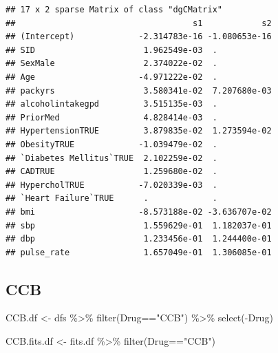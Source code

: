 \documentclass[
]{article}
\newenvironment{Shaded}{\begin{snugshade}}{\end{snugshade}}
\newcommand{\FloatTok}[1]{\textcolor[rgb]{0.00,0.00,0.81}{#1}}
\newcommand{\FunctionTok}[1]{\textcolor[rgb]{0.00,0.00,0.00}{#1}}
\newcommand{\NormalTok}[1]{#1}
\newcommand{\OtherTok}[1]{\textcolor[rgb]{0.56,0.35,0.01}{#1}}
\newcommand{\SpecialCharTok}[1]{\textcolor[rgb]{0.00,0.00,0.00}{#1}}
\newcommand{\StringTok}[1]{\textcolor[rgb]{0.31,0.60,0.02}{#1}}
\begin{document}
\begin{Shaded}
\end{Shaded}

\begin{verbatim}
## 17 x 2 sparse Matrix of class "dgCMatrix"
##                                    s1            s2
## (Intercept)             -2.314783e-16 -1.080653e-16
## SID                      1.962549e-03  .           
## SexMale                  2.374022e-02  .           
## Age                     -4.971222e-02  .           
## packyrs                  3.580341e-02  7.207680e-03
## alcoholintakegpd         3.515135e-03  .           
## PriorMed                 4.828414e-03  .           
## HypertensionTRUE         3.879835e-02  1.273594e-02
## ObesityTRUE             -1.039479e-02  .           
## `Diabetes Mellitus`TRUE  2.102259e-02  .           
## CADTRUE                  1.259680e-02  .           
## HypercholTRUE           -7.020339e-03  .           
## `Heart Failure`TRUE      .             .           
## bmi                     -8.573188e-02 -3.636707e-02
## sbp                      1.559629e-01  1.182037e-01
## dbp                      1.233456e-01  1.244400e-01
## pulse_rate               1.657049e-01  1.306085e-01
\end{verbatim}

\hypertarget{ccb}{%
\subsection{CCB}\label{ccb}}

\begin{Shaded}
\begin{Highlighting}[]
\NormalTok{CCB.df }\OtherTok{\textless{}{-}}\NormalTok{ dfs }\SpecialCharTok{\%\textgreater{}\%} 
  \FunctionTok{filter}\NormalTok{(Drug}\SpecialCharTok{==}\StringTok{"CCB"}\NormalTok{) }\SpecialCharTok{\%\textgreater{}\%} 
  \FunctionTok{select}\NormalTok{(}\SpecialCharTok{{-}}\NormalTok{Drug)}
\end{Highlighting}
\end{Shaded}

\begin{Shaded}
\begin{Highlighting}[]
\NormalTok{CCB.fits.df }\OtherTok{\textless{}{-}}\NormalTok{ fits.df }\SpecialCharTok{\%\textgreater{}\%} 
  \FunctionTok{filter}\NormalTok{(Drug}\SpecialCharTok{==}\StringTok{"CCB"}\NormalTok{)}
\end{Highlighting}
\end{Shaded}
\end{document}
